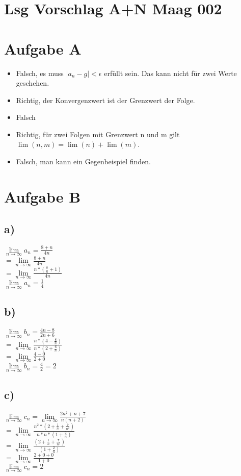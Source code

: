 \documentclass{article}
\begin{document}
	\section*{Lsg Vorschlag A+N Maag 002}
	\section*{Aufgabe A}
	\begin{itemize}
		\item Falsch, es muss $|a_{n} -g| < \epsilon$ erfüllt sein. Das kann nicht für zwei Werte geschehen.
		\item Richtig, der Konvergenzwert ist der Grenzwert der Folge.
		\item Falsch
		\item Richtig, für zwei Folgen mit Grenzwert n und m gilt $\lim(n,m) = \lim(n) + \lim(m)$.
		\item Falsch, man kann ein Gegenbeispiel finden.
	\end{itemize}
	
	\section*{Aufgabe B}
	\subsection*{a)}
	$\lim\limits_{n\to\infty}a_{n} = \frac{8+ n}{4n}$\\
	$ = \lim\limits_{n\to\infty} \frac{8+n}{4n}$ \\
	$ = \lim\limits_{n\to\infty} \frac{n * (\frac{8}{n} + 1)}{4n}$ \\
	$\lim\limits_{n\to\infty}a_{n} = \frac{1}{4}$ \\
	
	\subsection*{b)}
	$\lim\limits_{n\to\infty}b_{n} = \frac{4n - 8}{2n + 6} $ \\
	$ = \lim\limits_{n\to\infty} \frac{n * (4 - \frac{8}{n})}{n * (2 + \frac{6}{n})} $ \\
	$ = \lim\limits_{n\to\infty} \frac{4 - 0}{2 + 0} $ \\
	$\lim\limits_{n\to\infty}b_{n} =  \frac{4}{2} = 2 $ 
	
	\subsection*{c)}	
	$\lim\limits_{n\to\infty}c_{n} = \lim\limits_{n\to\infty} \frac{2n^2 + n + 7}{n(n + 2)}$ \\
	$ = \lim\limits_{n\to\infty} \frac{n^2* (2 + \frac{1}{n} + \frac{7}{n^2})}{n*n*(1 + \frac{2}{n})}$ \\
	$ = \lim\limits_{n\to\infty} \frac{(2 + \frac{1}{n} + \frac{7}{n^2})}{(1 + \frac{2}{n})}$ \\
	$ = \lim\limits_{n\to\infty} \frac{2 + 0 + 0}{1 + 0}$ \\
	$ \lim\limits_{n\to\infty}c_{n} = 2$
	
\end{document}
